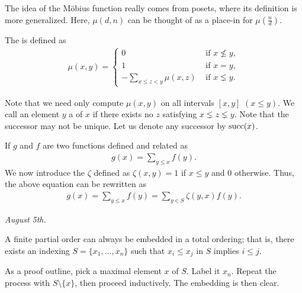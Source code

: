 The idea of the M\"obius function really comes from posets, where its definition is more generalized. Here, $\mu(d,n)$ can be thought of as a place-in for $\mu \left( \frac{n}{d} \right)$.

\begin{definition}
    The  is defined as
    \begin{align}
        \mu(x,y) = \begin{cases}
            0 &\text{ if } x \nleq y,\\
            1 &\text{ if } x = y,\\
            -\sum_{x \leq z < y} \mu(x,z) &\text{ if } x \lneq y.
        \end{cases}
    \end{align}
\end{definition}

Note that we need only compute $\mu(x,y)$ on all intervals $[x,y]$ $(x \leq y)$. We call an element $y$ a  of $x$ if there exists no $z$ satisfying $x \lneq z \lneq y$. Note that the successor may not be unique. Let us denote any successor by $\operatorname{succ}(x)$.

If $g$ and $f$ are two functions defined and related as
\begin{align}
    g(x) = \sum_{y \leq x} f(y).
\end{align}
We now introduce the  $\zeta$ defined as $\zeta(x,y) = 1$ if $x \leq y$ and $0$ otherwise. Thus, the above equation can be rewritten as
\begin{align}
    g(x) = \sum_{y \leq x} f(y) = \sum_{y \in S} \zeta(y,x) f(y). 
\end{align}

\noindent \textit{August 5th.}

\begin{lemma}
    A finite partial order can always be embedded in a total ordering; that is, there exists an indexing $S = \{x_{1},\ldots,x_{n}\}$ such that $x_{i} \leq x_{j}$ in $S$ implies $i \leq j$.
\end{lemma}

As a proof outline, pick a maximal element $x$ of $S$. Label it $x_{n}$. Repeat the process with $S\setminus\{x\}$, then proceed inductively. The embedding is then clear.

